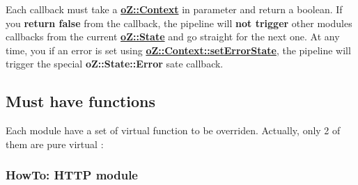 Each callback must take a {\bfseries{\mbox{\hyperlink{classo_z_1_1_context}{o\+Z\+::\+Context}}}} in parameter and return a boolean. If you {\bfseries{return false}} from the callback, the pipeline will {\bfseries{not trigger}} other modules\textquotesingle{} callbacks from the current {\bfseries{\mbox{\hyperlink{namespaceo_z_a356b278f7c65def0cae75fca8cae268e}{o\+Z\+::\+State}}}} and go straight for the next one. At any time, you if an error is set using {\bfseries{\mbox{\hyperlink{classo_z_1_1_context_a036d993634650ee8414c2f12d49d0204}{o\+Z\+::\+Context\+::set\+Error\+State}}}}, the pipeline will trigger the special {\bfseries{o\+Z\+::\+State\+::\+Error}} sate callback.


\begin{DoxyCode}{0}
\DoxyCodeLine{\{}
\DoxyCodeLine{    \}}
\DoxyCodeLine{\}}
\end{DoxyCode}


\subsection*{Must have functions}

Each module have a set of virtual function to be overriden. Actually, only 2 of them are pure virtual \+: 
\begin{DoxyCode}{0}
\DoxyCodeLine{}
\end{DoxyCode}


\subsubsection*{How\+To\+: H\+T\+TP module}

